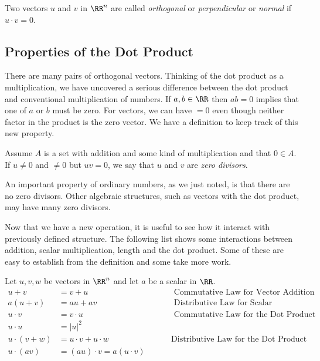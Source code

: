 \documentclass[fleqn]{report}
\begin{document}
\begin{defn}
Two vectors $u$ and $v$ in $\RR^n$ are called \emph{orthogonal}
or \emph{perpendicular} or \emph{normal} if $u \cdot v = 0$. 
\end{defn}

\subsection{Properties of the Dot Product}
\label{dot-product-properties}

There are many pairs of orthogonal vectors. Thinking of the
dot product as a multiplication, we have uncovered a serious
difference between the dot product and conventional
multiplication of numbers. If $a,b\in \RR$ then $ab=0$
implies that one of $a$ or $b$ must be zero. For vectors, we
can have  $= 0$ even though neither factor in the
product is the zero vector. We have a definition to keep
track of this new property.

\begin{defn}
Assume $A$ is a set with addition and some kind of
multiplication and that $0 \in A$. If $u \neq 0$ and $\neq 0$
but $uv =0$, we say that $u$ and $v$ are \emph{zero divisors}.
\end{defn}

An important property of ordinary numbers, as we just noted,
is that there are no zero divisors. Other algebraic
structures, such as vectors with the dot product, may have
many zero divisors.

Now that we have a new operation, it is useful to see how it
interact with previously defined structure. The following list shows
some interactions between addition, scalar multiplication,
length and the dot product. Some of these are easy to
establish from the definition and some take more work.

\begin{prop}
Let $u,v,w$ be vectors in $\RR^n$ and let $a$ be a scalar in $\RR$.
\begin{displaymath}
\begin{array}{rll}
u + v & = v + u & \hspace{1cm} \text{ Commutative Law for
Vector Addition} \\
a (u+v) & = au + av & \hspace{1cm} \text{ Distributive Law for
Scalar Multiplication}\\
u \cdot v & = v \cdot u & \hspace{1cm} \text{ Commutative
Law for the Dot Product}\\
u \cdot u & = |u|^2 & \\
u \cdot (v+w) & = u \cdot v + u \cdot w & \hspace{1cm} \text{
Distributive Law for the Dot Product}\\
u \cdot (av) & = (au) \cdot v = a (u \cdot v) 
\end{array}
\end{displaymath}
\end{prop}
\end{document}
